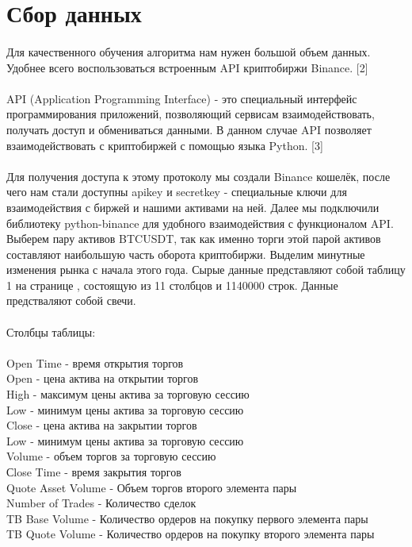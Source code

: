 \documentclass{article}
\begin{document}
	\section{Сбор данных}
	\paragraph{}
	Для  качественного обучения алгоритма нам нужен большой объем данных. Удобнее всего воспользоваться встроенным API криптобиржи Binance. [2]
	\paragraph{}
	API (Application Programming Interface) -  это специальный интерфейс программирования приложений, позволяющий сервисам взаимодействовать, получать доступ и обмениваться данными. В данном случае API позволяет взаимодействовать с криптобиржей с помощью языка Python. [3] 
	\paragraph{}
	Для получения доступа к этому протоколу мы создали Binance кошелёк, после чего нам стали доступны apikey и secretkey - специальные ключи для взаимодействия с биржей и нашими активами на ней. Далее мы подключили библиотеку python-binance для удобного взаимодействия с функционалом API. Выберем пару активов BTCUSDT, так как именно торги этой парой активов составляют наибольшую часть оборота криптобиржи. 
	Выделим минутные изменения рынка с начала этого года. Сырые данные представляют собой таблицу 1 на странице \pageref{raw}, состоящую из 11 столбцов и 1140000 строк. Данные предстваляют собой свечи.
	\\
	\\
	Столбцы таблицы: 
	\\
	\\
	Open Time - время открытия торгов \\
	Open - цена актива на открытии торгов \\
	High - максимум цены актива за торговую сессию \\
	Low - минимум цены актива за торговую сессию \\
	Close - цена актива на закрытии торгов \\
	Low - минимум цены актива за торговую сессию \\
	Volume - объем торгов за торговую сессию\\
	Сlose Time - время закрытия торгов \\
	Quote Asset Volume - Объем торгов второго элемента пары\\
	Number of Trades - Количество сделок\\
	TB Base Volume - Количество ордеров на покупку первого элемента пары\\
	TB Quote Volume - Количество ордеров на покупку второго элемента пары 
\end{document}

